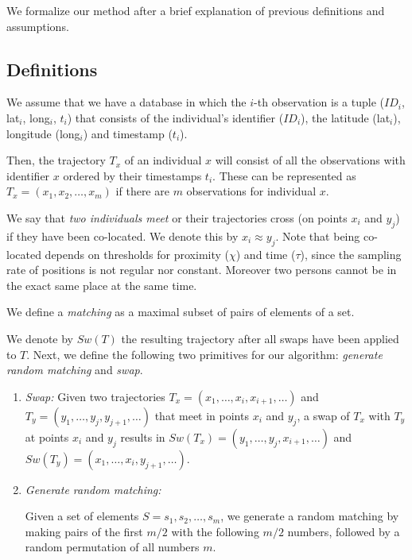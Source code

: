 \documentclass{llncs}
\begin{document}
We formalize our method after a brief explanation of previous definitions and assumptions.

\subsection{Definitions}
We assume that we have a database in which the $i$-th observation is a tuple ($ID_i$, lat$_i$, long$_i$, $t_i$) that
consists of the individual's identifier ($ID_i$), the latitude (lat$_i$), longitude (long$_i$) and timestamp ($t_i$).

Then, the trajectory $T_x$ of an individual \texttt{$x$} will consist of all the observations with identifier \texttt{$x$} ordered by their timestamps \texttt{$t_i$}.
These can be represented as $T_x = (x_1, x_2, \ldots, x_m)$ if there are $m$ observations for individual $x$.


We say that \emph{two individuals meet} or their trajectories cross (on points $x_i$ and $y_j$) if they have been co-located. We denote this by $x_i \approx y_j$. Note that being co-located depends on thresholds for proximity ($\chi$) and time ($\tau$), since the sampling rate of positions is not regular nor constant. Moreover two persons cannot be in the exact same place at the same time.

We define a \emph{matching} as a maximal subset of pairs of elements of a set.

We denote by $Sw(T)$ the resulting trajectory after all swaps have been applied to $T$.
Next, we define the following two primitives for our algorithm: \emph{generate random matching} and \emph{swap}.
\begin{enumerate}

\item \emph{Swap:}
Given two trajectories $T_x = (x_1, \ldots, x_i, x_{i+1}, \ldots)$ and \linebreak
$T_y= (y_1, \ldots, y_j, y_{j+1}, \ldots)$ that meet in points $x_i$ and $y_j$, a swap of $T_x$ with $T_y$ at points $x_i$ and $y_j$ results in $Sw(T_x) = (y_1, \ldots, y_j, x_{i+1}, \ldots)$ and 
\linebreak
$Sw(T_y)= (x_1, \ldots, x_i, y_{j+1}, \ldots)$.
\item \emph{Generate random matching:} 

Given a set of elements $S = s_1, s_2,\ldots, s_m$, we generate a random matching by making pairs of the first $m/2$ with the following $m/2$ numbers, followed by a random permutation of all numbers $m$.
\end{enumerate}
\end{document}
